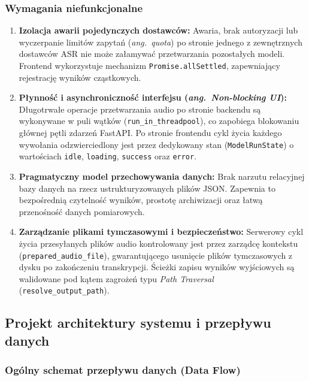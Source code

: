 \subsubsection{Wymagania niefunkcjonalne}

\begin{enumerate}
    \item \textbf{Izolacja awarii pojedynczych dostawców:} Awaria, brak autoryzacji lub wyczerpanie limitów zapytań (\textit{ang.~quota}) po stronie jednego z zewnętrznych dostawców ASR nie może załamywać przetwarzania pozostałych modeli. Frontend wykorzystuje mechanizm \texttt{Promise.allSettled}, zapewniający rejestrację wyników cząstkowych.
    \item \textbf{Płynność i asynchroniczność interfejsu (\textit{ang.~Non-blocking UI}):} Długotrwałe operacje przetwarzania audio po stronie backendu są wykonywane w puli wątków (\texttt{run\_in\_threadpool}), co zapobiega blokowaniu głównej pętli zdarzeń FastAPI. Po stronie frontendu cykl życia każdego wywołania odzwierciedlony jest przez dedykowany stan (\texttt{ModelRunState}) o wartościach \texttt{idle}, \texttt{loading}, \texttt{success} oraz \texttt{error}.
    \item \textbf{Pragmatyczny model przechowywania danych:} Brak narzutu relacyjnej bazy danych na rzecz ustrukturyzowanych plików JSON. Zapewnia to bezpośrednią czytelność wyników, prostotę archiwizacji oraz łatwą przenośność danych pomiarowych.
    \item \textbf{Zarządzanie plikami tymczasowymi i bezpieczeństwo:} Serwerowy cykl życia przesyłanych plików audio kontrolowany jest przez zarządcę kontekstu (\texttt{prepared\_}\allowbreak\texttt{audio\_}\allowbreak\texttt{file}), gwarantującego usunięcie plików tymczasowych z dysku po zakończeniu transkrypcji. Ścieżki zapisu wyników wyjściowych są walidowane pod kątem zagrożeń typu \textit{Path Traversal} (\texttt{resolve\_output\_path}).
\end{enumerate}
\subsection{Projekt architektury systemu i przepływu danych}
\label{subsec:architecture_design}

\subsubsection{Ogólny schemat przepływu danych (Data Flow)}

